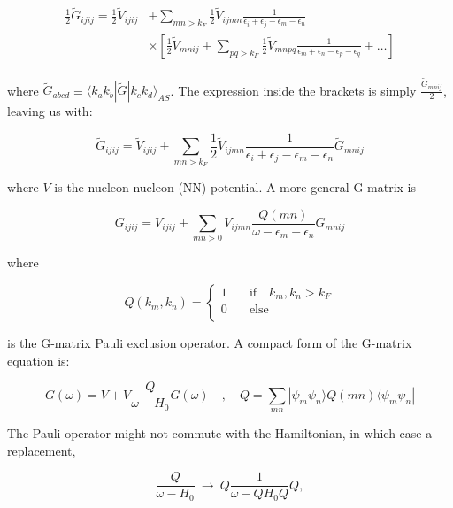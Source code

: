 \documentclass[10pt]{report}
\begin{document}
	\begin{align}
		\begin{split}
		\frac{1}{2}\tilde{G}_{ijij}= \frac{1}{2}\tilde{V}_{ijij} &+ \sum_{mn>k_F} \frac{1}{2}\tilde{V}_{ijmn}\frac{1}{\epsilon_i+\epsilon_j-\epsilon_m-\epsilon_n}\\
		&\times\left[ \frac{1}{2}\tilde{V}_{mnij} + \sum_{pq>k_F} \frac{1}{2}\tilde{V}_{mnpq}\frac{1}{\epsilon_m+\epsilon_n-\epsilon_p-\epsilon_q} + \ldots \right]
		\end{split}
	\end{align}
	
	where $\tilde{G}_{abcd} \equiv \langle k_ak_b|\tilde{G}|k_ck_d\rangle_{AS}$. The expression inside the brackets is simply $\frac{\tilde{G}_{mnij}}{2}$, leaving us with:
	
	\begin{equation}
		\tilde{G}_{ijij}= \tilde{V}_{ijij} + \sum_{mn>k_F} \frac{1}{2}\tilde{V}_{ijmn}\frac{1}{\epsilon_i+\epsilon_j-\epsilon_m-\epsilon_n}\tilde{G}_{mnij}
	\end{equation}
	
	where $V$ is the nucleon-nucleon (NN) potential. A more general G-matrix is
	
	\begin{equation}
		G_{ijij}= V_{ijij} + \sum_{mn>0} V_{ijmn}\frac{Q(mn)}{\omega-\epsilon_m-\epsilon_n}G_{mnij}
	\end{equation}
	
	where
	
	\begin{equation}
	Q(k_m,k_n) =
		\begin{cases}
		1  & \quad \text{if} \quad k_m,k_n > k_F\\
		0  & \quad \text{else}\\
		\end{cases}
	\end{equation}
	
	is the G-matrix Pauli exclusion operator. A compact form of the G-matrix equation is:
	
	\begin{equation}
		G(\omega) = V + V\frac{Q}{\omega - H_0}G(\omega) \quad,\quad Q = \sum_{mn} |\psi_m\psi_n\rangle Q(mn)\langle\psi_m\psi_n|
	\end{equation}
	
	The Pauli operator might not commute with the Hamiltonian, in which case a replacement,
	
	\begin{equation}
		\frac{Q}{\omega - H_0} \:\rightarrow\: Q\frac{1}{\omega - QH_0Q}Q,
	\end{equation}
	
\end{document}
